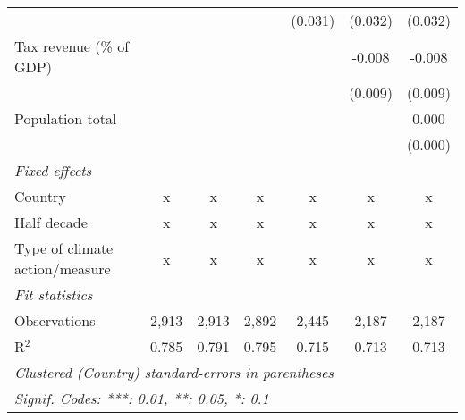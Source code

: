 \begin{tabular}{lcccccc}
                                                             &              &               &              & (0.031)      & (0.032) & (0.032)\\   
   Tax revenue (\% of GDP)                                   &              &               &              &              & -0.008  & -0.008\\   
                                                             &              &               &              &              & (0.009) & (0.009)\\   
   Population total                                          &              &               &              &              &         & 0.000\\   
                                                             &              &               &              &              &         & (0.000)\\   
   \emph{Fixed effects}\\
   Country                                                   & x            & x             & x            & x            & x       & x\\  
   Half decade                                               & x            & x             & x            & x            & x       & x\\  
   Type of climate action/measure                            & x            & x             & x            & x            & x       & x\\  
   \midrule \emph{Fit statistics}\\
   Observations                                              & 2,913        & 2,913         & 2,892        & 2,445        & 2,187   & 2,187\\  
   R$^2$                                                     & 0.785        & 0.791         & 0.795        & 0.715        & 0.713   & 0.713\\  
   \midrule
   \multicolumn{7}{l}{\emph{Clustered (Country) standard-errors in parentheses}}\\
   \multicolumn{7}{l}{\emph{Signif. Codes: ***: 0.01, **: 0.05, *: 0.1}}\\
\end{tabular}
\par\endgroup


